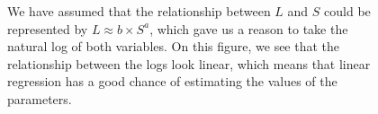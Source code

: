 \documentclass[
  letterpaper,
]{scrbook}
\begin{document}
\begin{figure}[pbt]


\caption{\label{fig-gradient-data}We have assumed that the relationship
between \(L\) and \(S\) could be represented by
\(L \approx b\times S^a\), which gave us a reason to take the natural
log of both variables. On this figure, we see that the relationship
between the logs look linear, which means that linear regression has a
good chance of estimating the values of the parameters.}

\end{figure}%
\end{document}
